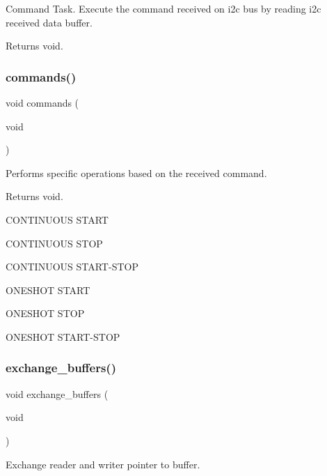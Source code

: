Command Task. Execute the command received on i2c bus by reading i2c received data buffer. 

\begin{DoxyReturn}{Returns}
void. 
\end{DoxyReturn}
\mbox{\label{i2c-th_8h_aaad2f6556489c51f2c24302e2cb4188a}} 
\subsubsection{\texorpdfstring{commands()}{commands()}}
{\footnotesize\ttfamily void commands (\begin{DoxyParamCaption}\item[{void}]{ }\end{DoxyParamCaption})}



Performs specific operations based on the received command. 

\begin{DoxyReturn}{Returns}
void. 
\end{DoxyReturn}
C\+O\+N\+T\+I\+N\+U\+O\+US S\+T\+A\+RT

C\+O\+N\+T\+I\+N\+U\+O\+US S\+T\+OP

C\+O\+N\+T\+I\+N\+U\+O\+US S\+T\+A\+R\+T-\/\+S\+T\+OP

O\+N\+E\+S\+H\+OT S\+T\+A\+RT

O\+N\+E\+S\+H\+OT S\+T\+OP

O\+N\+E\+S\+H\+OT S\+T\+A\+R\+T-\/\+S\+T\+OP \mbox{\label{i2c-th_8h_aafa3d59a1bde3085849eee08f110612f}} 
\subsubsection{\texorpdfstring{exchange\+\_\+buffers()}{exchange\_buffers()}}
{\footnotesize\ttfamily void exchange\+\_\+buffers (\begin{DoxyParamCaption}\item[{void}]{ }\end{DoxyParamCaption})}



Exchange reader and writer pointer to buffer. 

